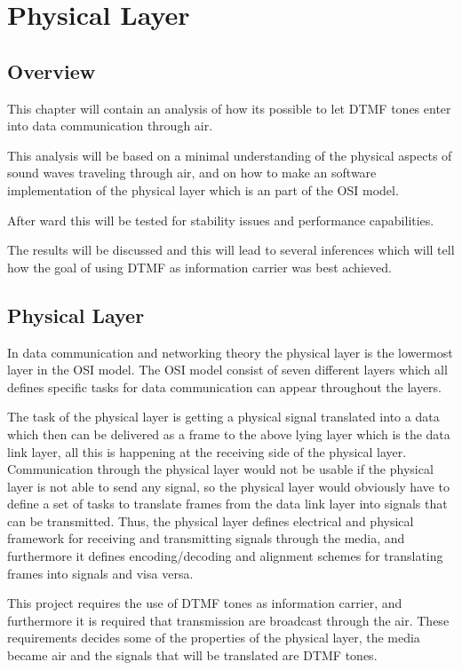 \section{Physical Layer}

	\subsection{Overview}
	This chapter will contain an analysis of how its possible to let DTMF tones
	enter into data communication through air.
	
	This analysis will be based on a minimal understanding of the physical aspects
	of sound waves traveling through air, and on how to make an software
	implementation of the physical layer which is an part of the OSI model.
	
	After ward this will be tested for stability issues and performance capabilities.
	
	The results will be discussed and this will lead to several inferences which will
	tell how the goal of using DTMF as information carrier was best achieved.

	\subsection{Physical Layer}
	In data communication and networking theory the physical layer is the lowermost
	layer in the OSI model. The OSI model consist of seven different layers which all
	defines specific tasks for data communication can appear throughout the layers.
	
	The task of the physical layer is getting a physical signal translated into a data which
	then can be delivered as a frame to the above lying layer which is the data link layer,
	all this is happening at the receiving side of the physical layer. Communication through
	the physical layer would not be usable if the physical layer is not able to send any signal,
	so the physical layer would obviously have to define a set of tasks to translate frames from
	the data link layer into signals that can be transmitted. Thus, the physical layer defines
	electrical and physical framework for receiving and transmitting signals through the media,
	and furthermore it defines encoding/decoding and alignment schemes for translating
	frames into signals and visa versa.
	
	This project requires the use of DTMF tones as information carrier, and furthermore it is
	required that transmission are broadcast through the air. These requirements decides some
	of the properties of the physical layer, the media became air and the signals that will be
	translated are DTMF tones.
	
